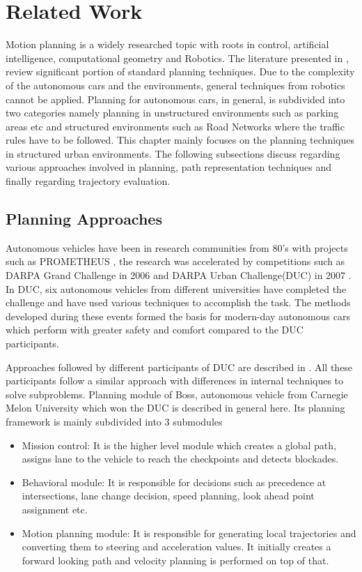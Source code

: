 \chapter{Related Work}
\label{related_work}
Motion planning is a widely researched topic with roots in control, artificial intelligence, computational geometry and Robotics. The literature presented in \cite{book_robot_motion_planning}, \cite{book_lavelle_planning} review significant portion of standard planning techniques. Due to the complexity of the autonomous cars and the environments, general techniques from robotics cannot be applied. Planning for autonomous cars, in general, is subdivided into two categories namely planning in unstructured environments such as parking areas etc and structured environments such as Road Networks where the traffic rules have to be followed. This chapter mainly focuses on the planning techniques in structured urban environments. The following subsections discuss regarding various approaches involved in planning, path representation techniques and finally regarding trajectory evaluation. 

\section{Planning Approaches}
\label{planning_aproaches}

Autonomous vehicles have been in research communities from 80's with projects such as PROMETHEUS \cite{prometheus}, the research was accelerated by competitions such as DARPA Grand Challenge in 2006 and DARPA Urban Challenge(DUC) in 2007 \cite{darpa_urban_challenge}. In DUC, six autonomous vehicles from different universities have completed the challenge and have used various techniques to accomplish the task. The methods developed during these events formed the basis for modern-day autonomous cars which perform with greater safety and comfort compared to the DUC participants. 

Approaches followed by different participants of DUC are described in \cite{darpa_urban_challenge}. All these participants follow a similar approach with differences in internal techniques to solve subproblems. Planning module of Boss, autonomous vehicle from Carnegie Melon University which won the DUC is described in general here. Its planning framework is mainly subdivided into 3 submodules 

\begin{itemize}
	\item Mission control: It is the higher level module which creates a global path, assigns lane to the vehicle to reach the checkpoints and detects blockades.
	\item Behavioral module: It is responsible for decisions such as precedence at intersections, lane change decision, speed planning, look ahead point assignment etc. 
	\item Motion planning module: It is responsible for generating local trajectories and converting them to steering and acceleration values. It initially creates a forward looking path and velocity planning is performed on top of that. 
\end{itemize}

